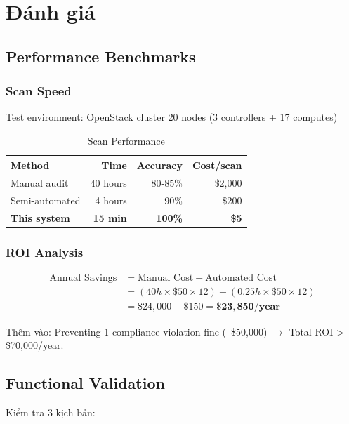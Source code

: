 \documentclass[12pt,a4paper]{report}
\begin{document}
\chapter{Đánh giá}

\section{Performance Benchmarks}

\subsection{Scan Speed}

Test environment: OpenStack cluster 20 nodes (3 controllers + 17 computes)

\begin{table}[H]
\centering
\caption{Scan Performance}
\begin{tabular}{lrrr}
\toprule
\textbf{Method} & \textbf{Time} & \textbf{Accuracy} & \textbf{Cost/scan} \\
\midrule
Manual audit & 40 hours & 80-85\% & \$2,000 \\
Semi-automated & 4 hours & 90\% & \$200 \\
\textbf{This system} & \textbf{15 min} & \textbf{100\%} & \textbf{\$5} \\
\bottomrule
\end{tabular}
\end{table}

\subsection{ROI Analysis}

\begin{align*}
\text{Annual Savings} &= \text{Manual Cost} - \text{Automated Cost} \\
&= (40h \times \$50 \times 12) - (0.25h \times \$50 \times 12) \\
&= \$24,000 - \$150 = \mathbf{\$23,850/year}
\end{align*}

Thêm vào: Preventing 1 compliance violation fine (~\$50,000) $\rightarrow$ Total ROI > \$70,000/year.

\section{Functional Validation}

Kiểm tra 3 kịch bản:
\end{document}

